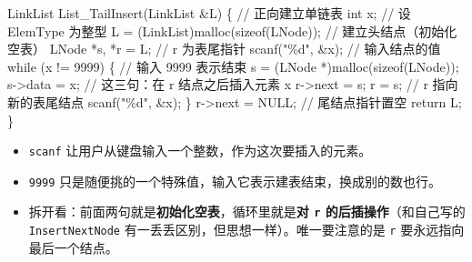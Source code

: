 \documentclass[10.5pt,a4paper,oneside]{article}
\providecommand{\tightlist}{\setlength{\itemsep}{2pt}\setlength{\parskip}{0pt}}
\newenvironment{Shaded}{}{}
\newcommand{\CommentTok}[1]{\textcolor[rgb]{0.18,0.55,0.23}{#1}}
\newcommand{\ControlFlowTok}[1]{\textcolor[rgb]{0.12,0.31,0.71}{#1}}
\newcommand{\DataTypeTok}[1]{\textcolor[rgb]{0.12,0.31,0.71}{#1}}
\newcommand{\DecValTok}[1]{\textcolor[rgb]{0.77,0.35,0.07}{#1}}
\newcommand{\KeywordTok}[1]{\textcolor[rgb]{0.12,0.31,0.71}{#1}}
\newcommand{\NormalTok}[1]{#1}
\newcommand{\OperatorTok}[1]{\textcolor[rgb]{0.20,0.20,0.20}{#1}}
\newcommand{\SpecialCharTok}[1]{\textcolor[rgb]{0.63,0.19,0.43}{#1}}
\newcommand{\StringTok}[1]{\textcolor[rgb]{0.63,0.19,0.43}{#1}}
\begin{document}
\begin{Shaded}
\begin{Highlighting}[]
\NormalTok{LinkList List\_TailInsert}\OperatorTok{(}\NormalTok{LinkList }\OperatorTok{\&}\NormalTok{L}\OperatorTok{)} \OperatorTok{\{}          \CommentTok{// 正向建立单链表}
    \DataTypeTok{int}\NormalTok{ x}\OperatorTok{;}                                        \CommentTok{// 设 ElemType 为整型}
\NormalTok{    L }\OperatorTok{=} \OperatorTok{(}\NormalTok{LinkList}\OperatorTok{)}\NormalTok{malloc}\OperatorTok{(}\KeywordTok{sizeof}\OperatorTok{(}\NormalTok{LNode}\OperatorTok{));}          \CommentTok{// 建立头结点（初始化空表）}
\NormalTok{    LNode }\OperatorTok{*}\NormalTok{s}\OperatorTok{,} \OperatorTok{*}\NormalTok{r }\OperatorTok{=}\NormalTok{ L}\OperatorTok{;}                             \CommentTok{// r 为表尾指针}
\NormalTok{    scanf}\OperatorTok{(}\StringTok{"}\SpecialCharTok{\%d}\StringTok{"}\OperatorTok{,} \OperatorTok{\&}\NormalTok{x}\OperatorTok{);}                              \CommentTok{// 输入结点的值}
    \ControlFlowTok{while} \OperatorTok{(}\NormalTok{x }\OperatorTok{!=} \DecValTok{9999}\OperatorTok{)} \OperatorTok{\{}                           \CommentTok{// 输入 9999 表示结束}
\NormalTok{        s }\OperatorTok{=} \OperatorTok{(}\NormalTok{LNode }\OperatorTok{*)}\NormalTok{malloc}\OperatorTok{(}\KeywordTok{sizeof}\OperatorTok{(}\NormalTok{LNode}\OperatorTok{));}
\NormalTok{        s}\OperatorTok{{-}\textgreater{}}\NormalTok{data }\OperatorTok{=}\NormalTok{ x}\OperatorTok{;}                              \CommentTok{// 这三句：在 r 结点之后插入元素 x}
\NormalTok{        r}\OperatorTok{{-}\textgreater{}}\NormalTok{next }\OperatorTok{=}\NormalTok{ s}\OperatorTok{;}
\NormalTok{        r }\OperatorTok{=}\NormalTok{ s}\OperatorTok{;}                                    \CommentTok{// r 指向新的表尾结点}
\NormalTok{        scanf}\OperatorTok{(}\StringTok{"}\SpecialCharTok{\%d}\StringTok{"}\OperatorTok{,} \OperatorTok{\&}\NormalTok{x}\OperatorTok{);}
    \OperatorTok{\}}
\NormalTok{    r}\OperatorTok{{-}\textgreater{}}\NormalTok{next }\OperatorTok{=}\NormalTok{ NULL}\OperatorTok{;}                               \CommentTok{// 尾结点指针置空}
    \ControlFlowTok{return}\NormalTok{ L}\OperatorTok{;}
\OperatorTok{\}}
\end{Highlighting}
\end{Shaded}

\begin{itemize}
\tightlist
\item
  \texttt{scanf} 让用户从键盘输入一个整数，作为这次要插入的元素。
\item
  \texttt{9999}
  只是随便挑的一个特殊值，输入它表示建表结束，换成别的数也行。
\item
  拆开看：前面两句就是\textbf{初始化空表}，循环里就是\textbf{对
  \texttt{r} 的后插操作}（和自己写的 \texttt{InsertNextNode}
  有一丢丢区别，但思想一样）。唯一要注意的是 \texttt{r}
  要永远指向最后一个结点。
\end{itemize}
\end{document}
